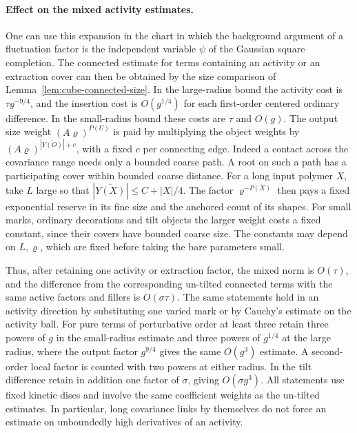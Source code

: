 \documentclass[11pt]{article}
\theoremstyle{definition}
\begin{document}
\paragraph{Effect on the mixed activity estimates.}
One can use this expansion in the chart in which the background
argument of a fluctuation factor is the independent variable
\(\psi\) of the Gaussian square completion. The connected estimate
for terms containing an activity or an extraction cover can then
be obtained by the size comparison of Lemma~\ref{lem:cube-connected-size}.
In the large-radius bound the activity cost is
\(\tau g^{-9/4}\), and the insertion cost is \(O(g^{1/4})\)
for each first-order centered ordinary difference. In the
small-radius bound these costs are \(\tau\) and \(O(g)\).
The output size weight \((A\varrho)^{P(U)}\) is paid by
multiplying the object weights by
\((A\varrho)^{|\overline{Y(O)}|+c}\), with a fixed \(c\)
per connecting edge. Indeed a contact across the covariance
range needs only a bounded coarse path. A root on such a
path has a participating cover within bounded coarse distance.
For a long input polymer \(X\), take \(L\) large so that
\(|\overline{Y(X)}|\le C+|X|/4\). The factor
\(\varrho^{-P(X)}\) then pays a fixed exponential reserve
in its fine size and the anchored count of its shapes.
For small marks, ordinary decorations and tilt objects
the larger weight costs a fixed constant, since their
covers have bounded coarse size. The constants may
depend on \(L,\varrho\), which are fixed before taking
the bare parameters small.

Thus, after retaining one activity or extraction factor,
the mixed norm is \(O(\tau)\), and the difference from
the corresponding un-tilted connected terms with the same
active factors and fillers is
\(O(\sigma\tau)\). The same statements hold in an
activity direction by substituting one varied mark or by
Cauchy's estimate on the activity ball. For pure terms
of perturbative order at least three retain three powers
of \(g\) in the small-radius estimate and three powers of
\(g^{1/4}\) at the large radius, where the output factor
\(g^{9/4}\) gives the same \(O(g^3)\) estimate. A second-order
local factor is counted with two powers at either radius.
In the tilt difference retain in addition one factor of
\(\sigma\), giving \(O(\sigma g^3)\). All statements use fixed
kinetic discs and involve the same coefficient weights as
the un-tilted estimates.
In particular, long covariance links by themselves do not
force an estimate on unboundedly high derivatives of an activity.
\end{document}

